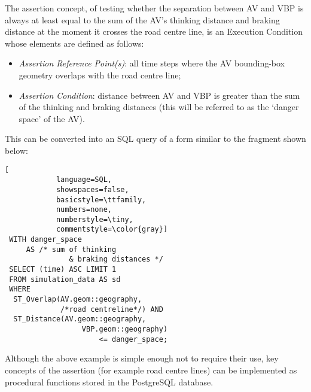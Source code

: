 The assertion concept, of testing whether the separation between AV and VBP is always at least equal to the sum of the AV's thinking distance and braking distance at the moment it crosses the road centre line, is an Execution Condition whose elements are defined as follows:
	\begin{itemize}
		\item \emph{Assertion Reference Point(s)}: all time steps where the AV bounding-box geometry overlaps with the road centre line;
		\item \emph{Assertion Condition}: distance between AV and VBP is greater than the sum of the thinking and braking distances (this will be referred to as the `danger space' of the AV).
	\end{itemize}
 
%
This can be converted into an SQL query of a form similar to the fragment shown below:
 \begin{lstlisting}[
            language=SQL,
            showspaces=false,
            basicstyle=\ttfamily,
            numbers=none,
            numberstyle=\tiny,
            commentstyle=\color{gray}]
 WITH danger_space  
     AS /* sum of thinking
               & braking distances */        
 SELECT (time) ASC LIMIT 1
 FROM simulation_data AS sd
 WHERE
  ST_Overlap(AV.geom::geography, 
             /*road centreline*/) AND
  ST_Distance(AV.geom::geography, 
                  VBP.geom::geography)
                      <= danger_space;
\end{lstlisting}

Although the above example is simple enough not to require their use, key concepts of the assertion (for example road centre lines) can be implemented as procedural functions stored in the PostgreSQL database.%

